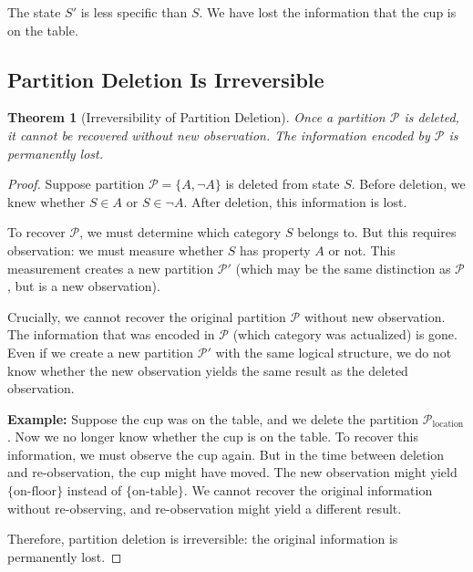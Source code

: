 \documentclass[twocolumn,10pt]{article}
\newtheorem{theorem}{Theorem}[section]
\theoremstyle{definition}
\theoremstyle{remark}
\begin{document}
The state $S'$ is less specific than $S$. We have lost the information that the cup is on the table.

\subsection{Partition Deletion Is Irreversible}

\begin{theorem}[Irreversibility of Partition Deletion]
\label{thm:irreversibility}
Once a partition $\mathcal{P}$ is deleted, it cannot be recovered without new observation. The information encoded by $\mathcal{P}$ is permanently lost.
\end{theorem}

\begin{proof}
Suppose partition $\mathcal{P} = \{A, \neg A\}$ is deleted from state $S$. Before deletion, we knew whether $S \in A$ or $S \in \neg A$. After deletion, this information is lost.

To recover $\mathcal{P}$, we must determine which category $S$ belongs to. But this requires observation: we must measure whether $S$ has property $A$ or not. This measurement creates a new partition $\mathcal{P}'$ (which may be the same distinction as $\mathcal{P}$, but is a new observation).

Crucially, we cannot recover the original partition $\mathcal{P}$ without new observation. The information that was encoded in $\mathcal{P}$ (which category was actualized) is gone. Even if we create a new partition $\mathcal{P}'$ with the same logical structure, we do not know whether the new observation yields the same result as the deleted observation.

\vspace{0.2cm}
\noindent\textbf{Example:} Suppose the cup was on the table, and we delete the partition $\mathcal{P}_{\text{location}}$. Now we no longer know whether the cup is on the table. To recover this information, we must observe the cup again. But in the time between deletion and re-observation, the cup might have moved. The new observation might yield $\{\text{on-floor}\}$ instead of $\{\text{on-table}\}$. We cannot recover the original information without re-observing, and re-observation might yield a different result.

\vspace{0.2cm}
\noindent Therefore, partition deletion is irreversible: the original information is permanently lost.
\end{proof}
\end{document}
